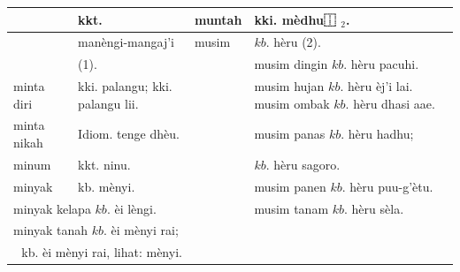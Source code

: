 \documentclass[10pt]{article}
\begin{document}
\begin{center}
\begin{tabular}{|l|l|l|l|}
\hline
 & kkt. & muntah & kki. mèdhu⿰ \({ }_{2}\). \\
\hline
 & manèngi-mangaj'i & musim & \(k b\). hèru (2). \\
\hline
 & (1). &  & musim dingin \(k b\). hèru pacuhi. \\
\hline
minta diri & kki. palangu; kki. palangu lii. &  & musim hujan \(k b\). hèru èj'i lai. musim ombak \(k b\). hèru dhasi aae. \\
\hline
minta nikah & Idiom. tenge dhèu. &  & musim panas \(k b\). hèru hadhu; \\
\hline
minum & kkt. ninu. &  & \(k b\). hèru sagoro. \\
\hline
minyak & kb. mènyi. &  & musim panen \(k b\). hèru puu-g'ètu. \\
\hline
\multicolumn{2}{|l|}{minyak kelapa \(k b\). èi lèngi.} &  & musim tanam \(k b\). hèru sèla. \\
\hline
\multicolumn{2}{|l|}{minyak tanah \(k b\). èi mènyi rai;} &  &  \\
\hline
\multicolumn{2}{|r|}{kb. èi mènyi rai, lihat: mènyi.} &  &  \\
\hline
\end{tabular}
\end{center}
\end{document}
